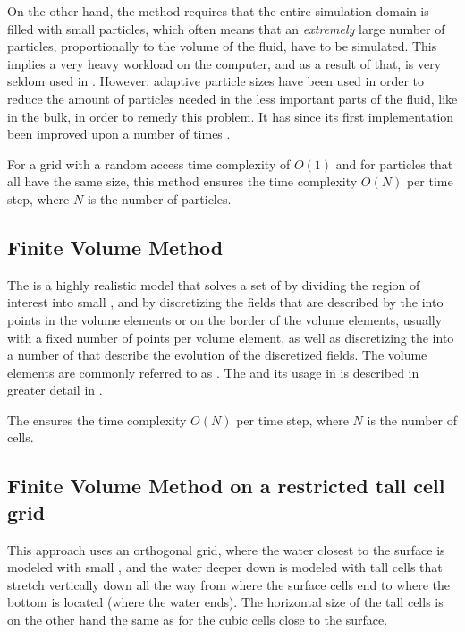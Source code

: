 On the other hand, the \SPH method requires that the entire simulation domain is filled with small particles, which often means that an \emph{extremely} large number of particles, proportionally to the volume of the fluid, have to be simulated. This implies a very heavy workload on the computer, and as a result of that, \SPH is very seldom used in . However, adaptive particle sizes have been used in order to reduce the amount of particles needed in the less important parts of the fluid, like in the bulk, in order to remedy this problem. It has since its first implementation \citep{Desbrun1999} been improved upon a number of times \citep[e.g.][]{Yan2009}.

For a grid with a random access time complexity of $O(1)$ and for particles that all have the same size, this method ensures the time complexity $O(N)$ per time step, where $N$ is the number of particles.

\subsection{Finite Volume Method}

The \FVM is a highly realistic model that solves a set of \PDEs by dividing the region of interest into small , and by discretizing the fields that are described by the \PDEs into points in the volume elements or on the border of the volume elements, usually with a fixed number of points per volume element, as well as discretizing the \PDEs into a number of \ODEs that describe the evolution of the discretized fields. The volume elements are commonly referred to as \cells. The \FVM and its usage in \CFD is described in greater detail in .

The \FVM ensures the time complexity $O(N)$ per time step, where $N$ is the number of cells.

\subsection{Finite Volume Method on a restricted tall cell grid}

This approach \citep{Chentanez2011} uses an orthogonal grid, where the water closest to the surface is modeled with small , and the water deeper down is modeled with tall cells that stretch vertically down all the way from where the surface cells end to where the bottom is located (where the water ends). The horizontal size of the tall cells is on the other hand the same as for the cubic cells close to the surface.

